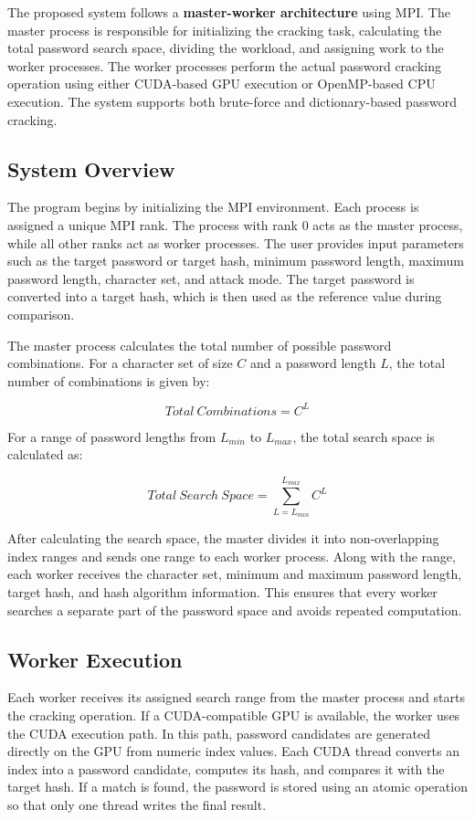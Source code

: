\documentclass[12pt,a4paper]{article}
\begin{document}
The proposed system follows a \textbf{master-worker architecture} using MPI. The master process is responsible for initializing the cracking task, calculating the total password search space, dividing the workload, and assigning work to the worker processes. The worker processes perform the actual password cracking operation using either CUDA-based GPU execution or OpenMP-based CPU execution. The system supports both brute-force and dictionary-based password cracking.

\subsection{System Overview}

The program begins by initializing the MPI environment. Each process is assigned a unique MPI rank. The process with rank 0 acts as the master process, while all other ranks act as worker processes. The user provides input parameters such as the target password or target hash, minimum password length, maximum password length, character set, and attack mode. The target password is converted into a target hash, which is then used as the reference value during comparison.

The master process calculates the total number of possible password combinations. For a character set of size $C$ and a password length $L$, the total number of combinations is given by:

\[
Total\ Combinations = C^L
\]

For a range of password lengths from $L_{min}$ to $L_{max}$, the total search space is calculated as:

\[
Total\ Search\ Space = \sum_{L=L_{min}}^{L_{max}} C^L
\]

After calculating the search space, the master divides it into non-overlapping index ranges and sends one range to each worker process. Along with the range, each worker receives the character set, minimum and maximum password length, target hash, and hash algorithm information. This ensures that every worker searches a separate part of the password space and avoids repeated computation.

\subsection{Worker Execution}

Each worker receives its assigned search range from the master process and starts the cracking operation. If a CUDA-compatible GPU is available, the worker uses the CUDA execution path. In this path, password candidates are generated directly on the GPU from numeric index values. Each CUDA thread converts an index into a password candidate, computes its hash, and compares it with the target hash. If a match is found, the password is stored using an atomic operation so that only one thread writes the final result.
\end{document}
